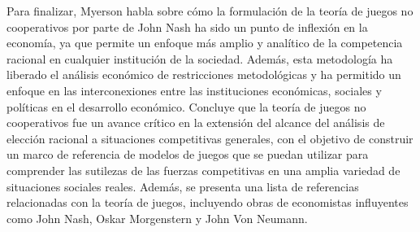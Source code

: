 \documentclass[11pt]{article}
\begin{document}
\begin{flushleft}
    Para finalizar, Myerson habla sobre cómo la formulación de la teoría de juegos no cooperativos por parte de John Nash ha sido un punto de inflexión en la economía, ya que permite un enfoque más amplio y analítico de la competencia racional en cualquier institución de la sociedad. Además, esta metodología ha liberado el análisis económico de restricciones metodológicas y ha permitido un enfoque en las interconexiones entre las instituciones económicas, sociales y políticas en el desarrollo económico. Concluye que la teoría de juegos no cooperativos fue un avance crítico en la extensión del alcance del análisis de elección racional a situaciones competitivas generales, con el objetivo de construir un marco de referencia de modelos de juegos que se puedan utilizar para comprender las sutilezas de las fuerzas competitivas en una amplia variedad de situaciones sociales reales. Además, se presenta una lista de referencias relacionadas con la teoría de juegos, incluyendo obras de economistas influyentes como John Nash, Oskar Morgenstern y John Von Neumann.
\end{flushleft}

\newpage

\medskip
\nocite{*}
 

\newpage
\end{document}
